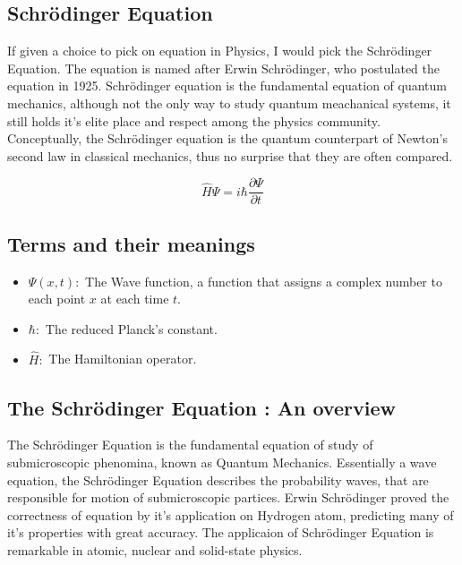 \subsection{Schrödinger Equation}

{
    If given a choice to pick on equation in Physics, I would pick the Schrödinger Equation.
    The equation is named after Erwin Schrödinger, who postulated the equation in 1925. Schrödinger equation is the fundamental equation of quantum mechanics, although not the only way to study quantum meachanical systems, it still holds it's elite place and respect  among the physics community. Conceptually, the Schrödinger equation is the quantum counterpart of Newton's second law in classical mechanics, thus no surprise that they are often compared.

    \begin{equation}
        \hat{H} \Psi = i\hbar\frac{\partial\Psi}{\partial t}
        \label{Schrödinger Equation}
    \end{equation}
}

\subsection{Terms and their meanings}
{
    	\begin{itemize}
    
        \item $\Psi(x,t) :$ The Wave function, a function that assigns a complex number to each point ${\displaystyle x}$ at each time ${\displaystyle t}$.
        
        \item $\hbar :$ The reduced Planck's constant. 
        
        \item $\hat{H} :$ The Hamiltonian operator.
        
        \end{itemize}
}

\subsection{The Schrödinger Equation : An overview}
{
    The Schrödinger Equation is the fundamental equation of study of submicroscopic phenomina, known as Quantum Mechanics. Essentially a wave equation, the Schrödinger Equation describes the probability waves, that are responsible for motion of submicroscopic partices.
    Erwin Schrödinger proved the correctness of equation by it's application on Hydrogen atom, predicting many of it's properties with great accuracy. The applicaion of Schrödinger Equation is remarkable in atomic, nuclear and solid-state physics.    
}

